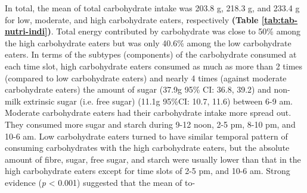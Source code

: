 In total, the mean of total carbohydrate intake was 203.8 g, 218.3 g, and 233.4 g for low, moderate, and high carbohydrate eaters, respectively \textbf{(Table \ref{tab:tab-nutri-indi})}. Total energy contributed by carbohydrate was close to 50\% among the high carbohydrate eaters but was only 40.6\% among the low carbohydrate eaters. In terms of the subtypes (components) of the carbohydrate consumed at each time slot, high carbohydrate eaters consumed as much as more than 2 times (compared to low carbohydrate eaters) and nearly 4 times (against moderate carbohydrate eaters) the amount of sugar (37.9g 95\% CI: 36.8, 39.2) and non-milk extrinsic sugar (i.e. free sugar) (11.1g 95\%CI: 10.7, 11.6) between 6-9 am. Moderate carbohydrate eaters had their carbohydrate intake more spread out. They consumed more sugar and starch during 9-12 noon, 2-5 pm, 8-10 pm, and 10-6 am. Low carbohydrate eaters turned to have similar temporal pattern of consuming carbohydrates with the high carbohydrate eaters, but the absolute amount of fibre, sugar, free sugar, and starch were usually lower than that in the high carbohydrate eaters except for time slots of 2-5 pm, and 10-6 am. Strong evidence (\textit{p} < 0.001) suggested that the mean of to-





